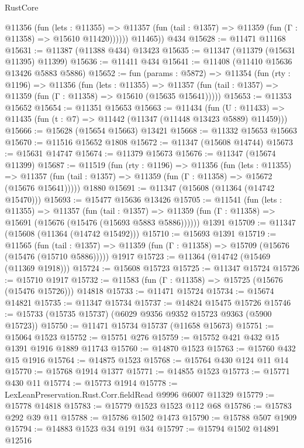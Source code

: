 \begin{lexlean}{RustCore}
\begin{coremodule}
            @11356
              (fun (lets : @11355) =>
              @11357 (fun (tail : @1357) => @11359 (fun (Γ : @11358) => @15610 @11420))))))
        @11465))
    @434
@15628 := @11471 @11168
@15631 := @11387 (@11388 @434) @13423
@15635 := @11347 (@11379 (@15631 @11395) @11399)
@15636 := @11411 @434
@15641 := @11408 (@11410 @15636 @13426 @5883 @5886)
@15652 := fun (params : @5872) =>
  @11354
    (fun (rty : @1196) =>
    @11356
      (fun (lets : @11355) =>
      @11357 (fun (tail : @1357) => @11359 (fun (Γ : @11358) => @15610 (@15635 @15641)))))
@15653 := @11353 @15652
@15654 := @11351 @15653
@15663 := @11434
    (fun (U : @11433) => @11435 (fun (t : @7) => @11442 (@11347 (@11448 @13423 @5889) @11459)))
@15666 := @15628 (@15654 @15663) @13421
@15668 := @11332 @15653 @15663
@15670 := @11516 @15652 @1808
@15672 := @11347 (@15608 @14744)
@15673 := @15631 @14747
@15674 := @11379 @15673
@15676 := @11347 (@15674 @11399)
@15687 := @11519
    (fun (rty : @1196) =>
    @11356
      (fun (lets : @11355) =>
      @11357 (fun (tail : @1357) => @11359 (fun (Γ : @11358) => @15672 (@15676 @15641)))))
    @1880
@15691 := @11347 (@15608 (@11364 (@14742 @15470)))
@15693 := @15477 @15636 @13426
@15705 := @11541
    (fun (lets : @11355) =>
    @11357
      (fun (tail : @1357) =>
      @11359 (fun (Γ : @11358) => @15691 (@15676 (@15476 (@15693 @5883 @5886))))))
    @1391
@15709 := @11347 (@15608 (@11364 (@14742 @15492)))
@15710 := @15693 @1391
@15719 := @11565
    (fun (tail : @1357) => @11359 (fun (Γ : @11358) => @15709 (@15676 (@15476 (@15710 @5886)))))
    @1917
@15723 := @11364 (@14742 (@15469 (@11369 @1918)))
@15724 := @15608 @15723
@15725 := @11347 @15724
@15726 := @15710 @1917
@15732 := @11583 (fun (Γ : @11358) => @15725 (@15676 (@15476 @15726))) @14818
@15733 := @11471 @15724
@15734 := @15674 @14821
@15735 := @11347 @15734
@15737 := @14824 @15475 @15726
@15746 := @15733 (@15735 @15737) (@6029 @9356 @9352 @15723 @9363 (@5900 @15723))
@15750 := @11471 @15734 @15737 (@11658 @15673)
@15751 := @15064 @1523
@15752 := @15751 @276
@15759 := @15752 @421 @432 @15 @1391 @1916 @1889 @11743
@15760 := @14870 @1523
@15763 := @15760 @432 @15 @1916
@15764 := @14875 @1523
@15768 := @15764 @430 @124 @11 @14
@15770 := @15768 @1914 @1377
@15771 := @14855 @1523
@15773 := @15771 @430 @11
@15774 := @15773 @1914
@15778 := LexLeanPreservation.Rust.Corr.fieldRead @9996 @6007 @11329
@15779 := @15778 @14818
@15783 := @15779 @1523 @1523 @112 @68
@15786 := @15783 @292 @39 @11
@15788 := @15786 @1502 @1473
@15790 := @15788 @507 @1909
@15794 := @14883 @1523 @34 @191 @34
@15797 := @15794 @1502 @14891 @12516

\end{coremodule}
\end{lexlean}
